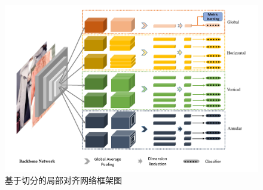\begin{figure}[h]
  \centering
  \includegraphics[width=1.0\linewidth]{Img/MGN.pdf}
  \caption{基于切分的局部对齐网络框架图}
  \label{fig:MGN}
\end{figure}
